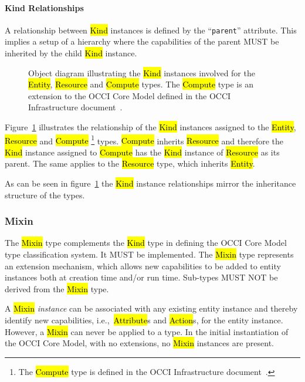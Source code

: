\documentclass[10pt,a4paper]{article}
\begin{document}
\paragraph*{Kind Relationships}
A relationship between \hl{Kind} instances is defined by the ``{\tt parent}'' attribute. This implies a setup of a hierarchy where the capabilities of the parent MUST be inherited by the child \hl{Kind} instance.

\begin{figure}[!h]
  {\centering {} \par}
  \caption{Object diagram illustrating the \hl{Kind} instances
    involved for the \hl{Entity}, \hl{Resource} and \hl{Compute}
    types. The \hl{Compute} type is an extension to the OCCI Core
    Model defined in the OCCI Infrastructure
    document~\cite{occi:infrastructure}.}
  \label{fig:kind_relationships}
\end{figure}

Figure~\ref{fig:kind_relationships} illustrates the relationship of
the \hl{Kind} instances assigned to the \hl{Entity}, \hl{Resource} and
\hl{Compute}%
\footnote{The \hl{Compute} type is defined in the OCCI Infrastructure
 document~\cite{occi:infrastructure}.}
types.
%
\hl{Compute} inherits \hl{Resource} and therefore the \hl{Kind}
instance assigned to \hl{Compute} has the \hl{Kind} instance
of \hl{Resource} as its parent.
The same applies to the \hl{Resource} type, which
inherits \hl{Entity}.

As can be seen in figure~\ref{fig:kind_relationships} the \hl{Kind}
instance relationships mirror the inheritance structure of the types.

\subsubsection{Mixin}
\label{sec:mixin}
The \hl{Mixin} type complements the \hl{Kind} type in defining the
OCCI Core Model type classification system. It MUST be
implemented. The \hl{Mixin} type represents an extension mechanism,
which allows new capabilities to be added to entity
instances both at creation time and/or run time.
%
Sub-types MUST NOT be derived from the \hl{Mixin} type.

A \hl{Mixin} {\em instance} can be associated with any existing
entity instance and thereby identify new capabilities,
i.e.,~\hl{Attribute}s and \hl{Action}s, for the entity instance.
However, a
\hl{Mixin} can never be applied to a type.  In the initial
instantiation of the OCCI Core Model, with no extensions, no
\hl{Mixin} instances are present.
\end{document}
